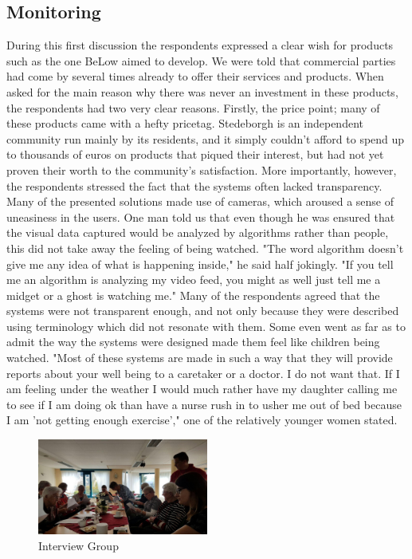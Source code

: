\documentclass{below-ext}
\begin{document}
\subsection{Monitoring}
During this first discussion the respondents expressed a clear wish for products such as the one BeLow aimed to develop. We were told that commercial parties had come by several times already to offer their services and products. When asked for the main reason why there was never an investment in these products, the respondents had two very clear reasons. Firstly, the price point; many of these products came with a hefty pricetag. Stedeborgh is an independent community run mainly by its residents, and it simply couldn't afford to spend up to thousands of euros on products that piqued their interest, but had not yet proven their worth to the community's satisfaction. More importantly, however, the respondents stressed the fact that the systems often lacked transparency. Many of the presented solutions made use of cameras, which aroused a sense of uneasiness in the users. One man told us that even though he was ensured that the visual data captured would be analyzed by algorithms rather than people, this did not take away the feeling of being watched. "The word algorithm doesn't give me any idea of what is happening inside," he said half jokingly. "If you tell me an algorithm is analyzing my video feed, you might as well just tell me a midget or a ghost is watching me." Many of the respondents agreed that the systems were not transparent enough, and not only because they were described using terminology which did not resonate with them. Some even went as far as to admit the way the systems were designed made them feel like children being watched. "Most of these systems are made in such a way that they will provide reports about your well being to a caretaker or a doctor. I do not want that. If I am feeling under the weather I would much rather have my daughter calling me to see if I am doing ok than have a nurse rush in to usher me out of bed because I am 'not getting enough exercise'," one of the relatively younger women stated. 

\begin{figure}
\center
\label{fig:interview}
\includegraphics[width=0.5\textwidth]{interview}
\caption{Interview Group}
\end{figure}
\end{document}
